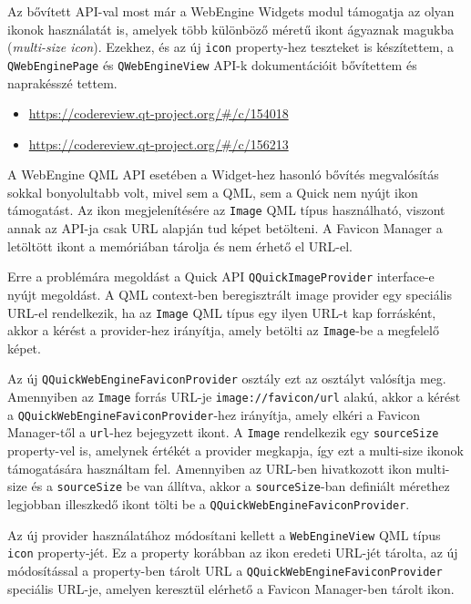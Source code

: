 \documentclass[12pt]{report}
\let\origurl\url
\renewcommand{\url}[1]{%
    \textcolor{blue}{\origurl{#1}}
}
\newcommand{\gerrit}[1]{%
    \textcolor{qtgreen}{\origurl{https://codereview.qt-project.org/\#/c/#1}}
}
\begin{document}
Az bővített API-val most már a WebEngine Widgets modul támogatja az olyan ikonok használatát
is, amelyek több különböző méretű ikont ágyaznak magukba (\textit{multi-size icon}).
Ezekhez, és az új \texttt{icon} property-hez teszteket is készítettem,
a \texttt{QWebEnginePage} és \texttt{QWebEngineView} API-k dokumentációit bővítettem és
naprakésszé tettem.

\begin{center}
    \begin{reviewbox}
        \begin{itemize}
            \renewcommand{\labelitemi}{\textcolor{qtgreen}{$\blacktriangleright$}}
            \item \gerrit{154018}
            \item \gerrit{156213}
        \end{itemize}
    \end{reviewbox}
\end{center}

A WebEngine QML API esetében a Widget-hez hasonló bővítés megvalósítás sokkal bonyolultabb
volt, mivel sem a QML, sem a Quick nem nyújt ikon támogatást. Az ikon megjelenítésére az
\texttt{Image} QML típus használható, viszont annak az API-ja csak URL alapján tud képet
betölteni. A Favicon Manager a letöltött ikont a memóriában tárolja és nem érhető el URL-el.

Erre a problémára megoldást a Quick API \texttt{QQuickImageProvider} interface-e nyújt
megoldást. A QML context-ben beregisztrált image provider egy speciális URL-el rendelkezik,
ha az \texttt{Image} QML típus egy ilyen URL-t kap forrásként, akkor a kérést a provider-hez
irányítja, amely betölti az \texttt{Image}-be a megfelelő képet.

Az új \texttt{QQuickWebEngineFaviconProvider} osztály ezt az osztályt valósítja meg.
Amennyiben az \texttt{Image} forrás URL-je \texttt{image://favicon/url} alakú, akkor a
kérést a \texttt{QQuickWebEngineFaviconProvider}-hez irányítja, amely elkéri a
Favicon Manager-től a \texttt{url}-hez bejegyzett ikont. A \texttt{Image} rendelkezik
egy \texttt{sourceSize} property-vel is, amelynek értékét a provider megkapja, így ezt a
multi-size ikonok támogatására használtam fel. Amennyiben az URL-ben hivatkozott ikon
multi-size és a \texttt{sourceSize} be van állítva, akkor a \texttt{sourceSize}-ban definiált
mérethez legjobban illeszkedő ikont tölti be a \texttt{QQuickWebEngineFaviconProvider}.

Az új provider használatához módosítani kellett a \texttt{WebEngineView} QML típus
\texttt{icon} property-jét. Ez a property korábban az ikon eredeti URL-jét tárolta,
az új módosítással a property-ben tárolt URL a \texttt{QQuickWebEngineFaviconProvider}
speciális URL-je, amelyen keresztül elérhető a Favicon Manager-ben tárolt ikon.
\end{document}
